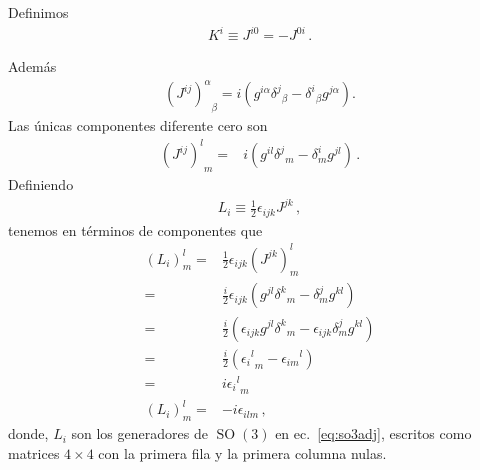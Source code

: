 \begin{frame}
Definimos
\begin{align}
  K^{i}\equiv J^{i0}=-J^{0i}\,.
\end{align}

Además
\begin{align}
  {\left(J^{ij}\right)^{\alpha}}_{\beta}=
  i\left(g^{i\alpha}{\delta^j}_\beta-{\delta^i}_\beta g^{j\alpha}\right).
\end{align}
Las únicas componentes diferente cero son
\begin{align}
  {\left(J^{ij}\right)^{l}}_{m}=&i \left( g^{il}{\delta^j}_m -\delta^i_m g^{jl}\right)\,.
\end{align}
Definiendo
\begin{align}
  \label{eq:lijjk}
  L_i\equiv \frac{1}{2}\epsilon_{ijk} J^{jk}\,,
\end{align}
tenemos en términos de componentes que
\begin{align}
  \left( L_i \right)^l_m=&\frac{1}{2} \epsilon_{ijk} \left( J^{jk} \right)^l_m \nonumber\\
             =&\frac{i}{2} \epsilon_{ijk}  \left( g^{jl}{\delta^k}_m -\delta^j_m g^{kl}\right) \nonumber\\
             =&\frac{i}{2}   \left( \epsilon_{ijk} g^{jl}{\delta^k}_m -\epsilon_{ijk}\delta^j_m g^{kl}\right) \nonumber\\
             =&\frac{i}{2}   \left( {{\epsilon_i}^{l}}_{m}-{{\epsilon_{im}}}^{l}\right) \nonumber\\
            =&i {{\epsilon_i}^{l}}_{m} \nonumber\\
   \left( L_i \right)^l_m =&-i \epsilon_{ilm}\,,
\end{align}
donde, $L_i$ son los generadores de $\operatorname{SO}(3)$ en ec.~\eqref{eq:so3adj}, escritos como matrices $4\times 4$ con la primera fila y la primera columna nulas.

\end{frame}

